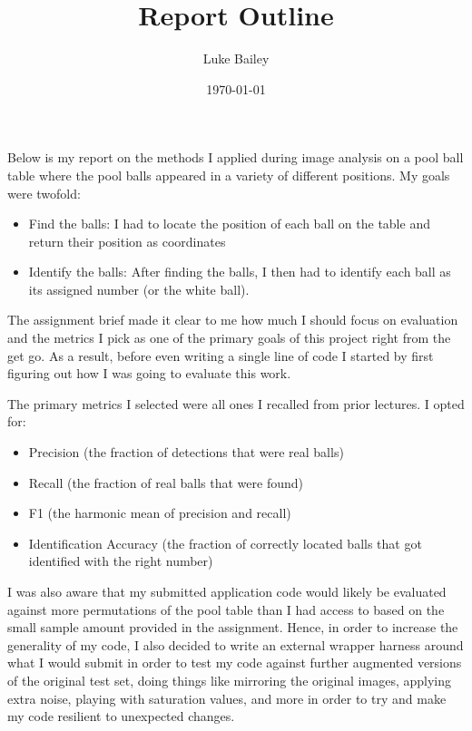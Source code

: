 \documentclass[11pt]{article}
\author{Luke Bailey}
\date{\today}
\title{Report Outline}
\begin{document}
\maketitle
\tableofcontents

Below is my report on the methods I applied during image analysis on a pool ball table where the pool balls appeared in a variety of different positions. My goals were twofold:

\begin{itemize}
\item Find the balls: I had to locate the position of each ball on the table and return their position as coordinates

\item Identify the balls: After finding the balls, I then had to identify each ball as its assigned number (or the white ball).
\end{itemize}

The assignment brief made it clear to me how much I should focus on evaluation and the metrics I pick as one of the primary goals of this project right from the get go. As a result, before even writing a single line of code I started by first figuring out how I was going to evaluate this work.

The primary metrics I selected were all ones I recalled from prior lectures. I opted for:
\begin{itemize}
\item Precision (the fraction of detections that were real balls)
\item Recall (the fraction of real balls that were found)
\item F1 (the harmonic mean of precision and recall)
\item Identification Accuracy (the fraction of correctly located balls that got identified with the right number)
\end{itemize}

I was also aware that my submitted application code would likely be evaluated against more permutations of the pool table than I had access to based on the small sample amount provided in the assignment. Hence, in order to increase the generality of my code, I also decided to write an external wrapper harness around what I would submit in order to test my code against further augmented versions of the original test set, doing things like mirroring the original images, applying extra noise, playing with saturation values, and more in order to try and make my code resilient to unexpected changes.
\end{document}

